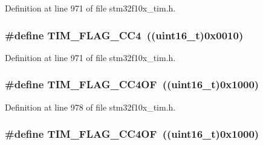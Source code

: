 Definition at line 971 of file stm32f10x\+\_\+tim.\+h.

\subsubsection[{\texorpdfstring{T\+I\+M\+\_\+\+F\+L\+A\+G\+\_\+\+C\+C4}{TIM_FLAG_CC4}}]{\setlength{\rightskip}{0pt plus 5cm}\#define T\+I\+M\+\_\+\+F\+L\+A\+G\+\_\+\+C\+C4~(({\bf uint16\+\_\+t})0x0010)}\hypertarget{group___t_i_m___flags_gafd0dc57b56941f8b8250d66e289542db}{}\label{group___t_i_m___flags_gafd0dc57b56941f8b8250d66e289542db}


Definition at line 971 of file stm32f10x\+\_\+tim.\+h.

\subsubsection[{\texorpdfstring{T\+I\+M\+\_\+\+F\+L\+A\+G\+\_\+\+C\+C4\+OF}{TIM_FLAG_CC4OF}}]{\setlength{\rightskip}{0pt plus 5cm}\#define T\+I\+M\+\_\+\+F\+L\+A\+G\+\_\+\+C\+C4\+OF~(({\bf uint16\+\_\+t})0x1000)}\hypertarget{group___t_i_m___flags_gafc8b04654766d98ba2c6fed601895a20}{}\label{group___t_i_m___flags_gafc8b04654766d98ba2c6fed601895a20}


Definition at line 978 of file stm32f10x\+\_\+tim.\+h.

\subsubsection[{\texorpdfstring{T\+I\+M\+\_\+\+F\+L\+A\+G\+\_\+\+C\+C4\+OF}{TIM_FLAG_CC4OF}}]{\setlength{\rightskip}{0pt plus 5cm}\#define T\+I\+M\+\_\+\+F\+L\+A\+G\+\_\+\+C\+C4\+OF~(({\bf uint16\+\_\+t})0x1000)}\hypertarget{group___t_i_m___flags_gafc8b04654766d98ba2c6fed601895a20}{}\label{group___t_i_m___flags_gafc8b04654766d98ba2c6fed601895a20}


